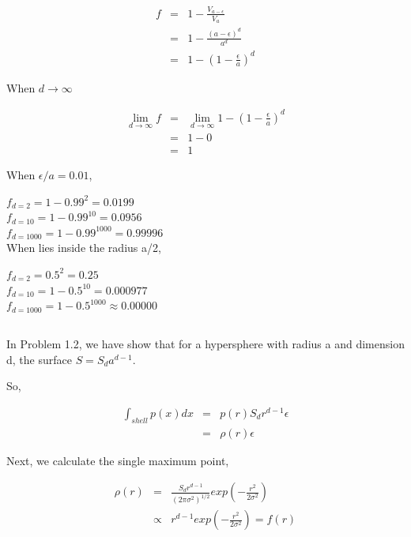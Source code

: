 \documentclass{article} %
\begin{document}
\begin{equation}
    \begin{array}{rcl}
     	f & = & 1 - \frac{V_{a-\epsilon}}{V_a}  \\
	& = &  1 - \frac{{(a-\epsilon)}^{d}}{a^d}\\
	& = & 1 - (1-\frac{\epsilon}{a})^d
    \end{array}
\end{equation}

When $d \to \infty$

\begin{equation}
    \begin{array}{rcl}
     	\lim\limits_{d \to \infty}^{} f & = & \lim\limits_{d \to \infty}^{}  1 - (1-\frac{\epsilon}{a})^d \\
	& = & 1 - 0 \\
	& = & 1
    \end{array}
\end{equation}

When $\epsilon / a = 0.01$,

$f_{d=2} = 1 - 0.99^2 = 0.0199$ \\
$f_{d=10} = 1 - 0.99^{10} = 0.0956$ \\
$f_{d=1000} = 1 - 0.99^{1000} = 0.99996$ \\

When lies inside the radius a/2,

$f_{d=2} = 0.5^2 = 0.25$ \\
$f_{d=10} = 1 - 0.5^{10} = 0.000977$ \\
$f_{d=1000} = 1 - 0.5^{1000} \approx 0.00000$ \\


\subsection{}
In Problem 1.2, we have show that for a hypersphere with radius a and dimension d, the surface $S = S_d a ^{d-1}$. 

So, 

\begin{equation}
    \begin{array}{rcl}
      	\int_{shell}^{} p(x) dx & = & p(r) S_d r^{d-1} \epsilon \\
	& = & \rho (r) \epsilon
    \end{array}
\end{equation}

Next, we calculate the  single maximum point,

\begin{equation}
    \begin{array}{rcl}
      	\rho (r) & = & \frac{S_d r^{d-1}}{(2\pi \sigma ^ 2) ^ {1/2}} exp ( - \frac{r^2}{2 \sigma ^2} ) \\
	& \propto & r^{d-1} exp ( - \frac{r^2}{2 \sigma ^2} )  =  f(r)\\
    \end{array}
\end{equation}
\end{document}
